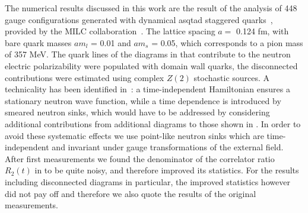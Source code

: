 
The numerical results discussed in this work are the result of the analysis of 448 gauge configurations generated with dynamical asqtad staggered quarks~\cite{Lepage:1998vj}, provided by the MILC collaboration~\cite{Bernard:2001av}. The lattice spacing $a =$ 0.124 fm, with bare quark
masses $am_l$ = 0.01 and $am_s$ = 0.05, which corresponds to a pion mass of 357 MeV. 
The quark lines of the diagrams in  that contribute to the neutron electric polarizability were
populated with domain wall quarks, the disconnected contributions were estimated using complex $Z(2)$ stochastic sources. A technicality has been identified in~\cite{Engelhardt:2007ub}: a time-independent Hamiltonian ensures a stationary neutron wave function, while a time dependence is introduced by smeared neutron sinks, which would have to be addressed by considering additional contributions from additional diagrams to those shown in . In order to avoid these systematic effects we use point-like neutron sinks  which are time-independent and invariant under gauge transformations of the external field. After first measurements we found the denominator of the correlator ratio $R_2(t)$ in  to be quite noisy, and therefore improved its statistics. For the results including disconnected diagrams in particular, the improved statistics however did not pay off and therefore we also quote the results of the original measurements.  


